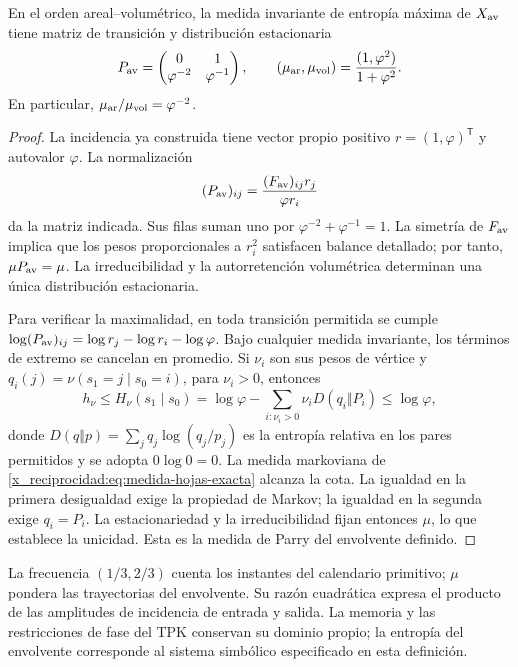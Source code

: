 \begin{proposition}
En el orden areal--volumétrico, la medida invariante de entropía máxima
de \(X_{\rm av}\) tiene matriz de transición y distribución estacionaria
\begin{equation}
 P_{\rm av}=\begin{pmatrix}0&1\\\varphi^{-2}&\varphi^{-1}\end{pmatrix},
 \qquad
 (\mu_{\rm ar},\mu_{\rm vol})
 =\frac{(1,\varphi^2)}{1+\varphi^2}.
 \label{x_reciprocidad:eq:medida-hojas-exacta}
\end{equation}
En particular, \(\mu_{\rm ar}/\mu_{\rm vol}=\varphi^{-2}\).
\end{proposition}
\begin{proof}
La incidencia ya construida tiene vector propio positivo
\(r=(1,\varphi)^{\mathsf T}\) y autovalor \(\varphi\). La
normalización
\[
 (P_{\rm av})_{ij}
 =\frac{(F_{\rm av})_{ij}r_j}{\varphi r_i}
\]
da la matriz indicada. Sus filas suman uno por
\(\varphi^{-2}+\varphi^{-1}=1\). La simetría de \(F_{\rm av}\)
implica que los pesos proporcionales a \(r_i^2\) satisfacen balance
detallado; por tanto, \(\mu P_{\rm av}=\mu\). La irreducibilidad y la
autorretención volumétrica determinan una única distribución estacionaria.

Para verificar la maximalidad, en toda transición permitida se cumple
\(\log(P_{\rm av})_{ij}=\log r_j-\log r_i-\log\varphi\).
Bajo cualquier medida invariante, los términos de extremo se cancelan
en promedio. Si \(\nu_i\) son sus pesos de vértice y
\(q_i(j)=\nu(s_1=j\mid s_0=i)\), para \(\nu_i>0\), entonces
\[
 h_\nu\leq H_\nu(s_1\mid s_0)
 =\log\varphi-\sum_{i:\nu_i>0}\nu_iD(q_i\Vert P_i)
 \leq\log\varphi,
\]
donde \(D(q\Vert p)=\sum_jq_j\log(q_j/p_j)\) es la entropía
relativa en los pares permitidos y se adopta \(0\log0=0\).
La medida markoviana de \eqref{x_reciprocidad:eq:medida-hojas-exacta} alcanza la cota.
La igualdad en la primera desigualdad exige la propiedad de Markov;
la igualdad en la segunda exige \(q_i=P_i\). La estacionariedad y
la irreducibilidad fijan entonces \(\mu\), lo que establece la
unicidad. Esta es la medida de Parry del envolvente definido.
\end{proof}

La frecuencia \((1/3,2/3)\) cuenta los instantes del calendario primitivo;
\(\mu\) pondera las trayectorias del envolvente. Su razón cuadrática
expresa el producto de las amplitudes de incidencia de entrada y salida.
La memoria y las restricciones de fase del TPK conservan su dominio
propio; la entropía del envolvente corresponde al sistema simbólico
especificado en esta definición.

